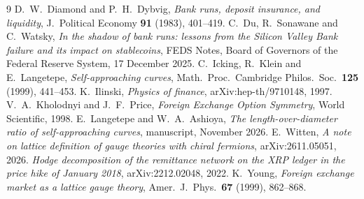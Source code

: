 \documentclass[11pt]{article}
\theoremstyle{definition}
\theoremstyle{remark}
\begin{document}
\begin{thebibliography}{9}
 D.~W.~Diamond and P.~H.~Dybvig, \emph{Bank runs, deposit insurance, and liquidity}, J.\ Political Economy \textbf{91} (1983), 401--419.
 C.~Du, R.~Sonawane and C.~Watsky, \emph{In the shadow of bank runs: lessons from the Silicon Valley Bank failure and its impact on stablecoins}, FEDS Notes, Board of Governors of the Federal Reserve System, 17 December 2025.
 C.~Icking, R.~Klein and E.~Langetepe, \emph{Self-approaching curves}, Math.\ Proc.\ Cambridge Philos.\ Soc.\ \textbf{125} (1999), 441--453.
 K.~Ilinski, \emph{Physics of finance}, arXiv:hep-th/9710148, 1997.
 V.~A.~Kholodnyi and J.~F.~Price, \emph{Foreign Exchange Option Symmetry}, World Scientific, 1998.
 E.~Langetepe and W.~A.~Ashioya, \emph{The length-over-diameter ratio of self-approaching curves}, manuscript, November 2026.
 E.~Witten, \emph{A note on lattice definition of gauge theories with chiral fermions}, arXiv:2611.05051, 2026.
 \emph{Hodge decomposition of the remittance network on the XRP ledger in the price hike of January 2018}, arXiv:2212.02048, 2022.
 K.~Young, \emph{Foreign exchange market as a lattice gauge theory}, Amer.\ J.\ Phys.\ \textbf{67} (1999), 862--868.
\end{thebibliography}
\end{document}
